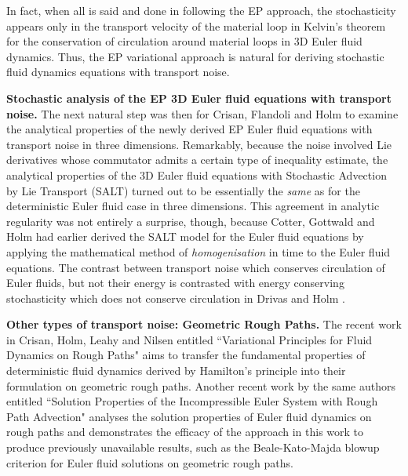 \documentclass[11pt, oneside]{article}   	%
\numberwithin{equation}{section}
\theoremstyle{plain}
\theoremstyle{definition}
\theoremstyle{remark}
\newcommand{\<}{\langle}
\renewcommand{\>}{\rangle}
\begin{document}
In fact, when all is said and done in following the EP approach, the stochasticity appears only in the transport velocity of the material loop in Kelvin's theorem for the conservation of circulation around material loops in 3D Euler fluid dynamics. 
Thus, the EP variational approach is natural for deriving stochastic fluid dynamics equations with transport noise.

{\bf  Stochastic analysis of the EP 3D Euler fluid equations with transport noise.}
The next natural step was then for Crisan, Flandoli and Holm \cite{CrFlHo2019} to examine the analytical properties of the newly derived EP Euler fluid equations with transport noise in three dimensions. Remarkably, because the noise involved Lie derivatives whose commutator admits a certain type of inequality estimate, the analytical properties of the 3D Euler fluid equations with Stochastic Advection by Lie Transport (SALT) turned out to be essentially the \emph{same} as for the deterministic Euler fluid case in three dimensions. This agreement in analytic regularity was not entirely a surprise, though, because Cotter, Gottwald and Holm \cite{cotter2017stochastic} had earlier derived the SALT model for the Euler fluid equations by applying the mathematical method of \emph{homogenisation} in time to the Euler fluid equations. The contrast between transport noise which conserves circulation of Euler fluids, but not their energy is contrasted with energy conserving stochasticity which does not conserve circulation in 
Drivas and Holm \cite{DrivasHolm2019,DrivasHolmLeahy2020}. 

{\bf  Other types of transport noise: Geometric Rough Paths.} The recent work in Crisan, Holm, Leahy and Nilsen \cite{crisan2022variational} entitled ``Variational Principles for Fluid Dynamics on Rough Paths" aims to transfer the fundamental properties of deterministic fluid dynamics derived by Hamilton's principle into their formulation on geometric rough paths. Another recent work \cite{crisan2022solution} by the same authors entitled ``Solution Properties of the Incompressible Euler System with Rough Path Advection" analyses the solution properties of Euler fluid dynamics on rough paths and demonstrates the efficacy of the approach in this work to produce previously unavailable results, such as the Beale-Kato-Majda blowup criterion for Euler fluid solutions on geometric rough paths.
\end{document}
